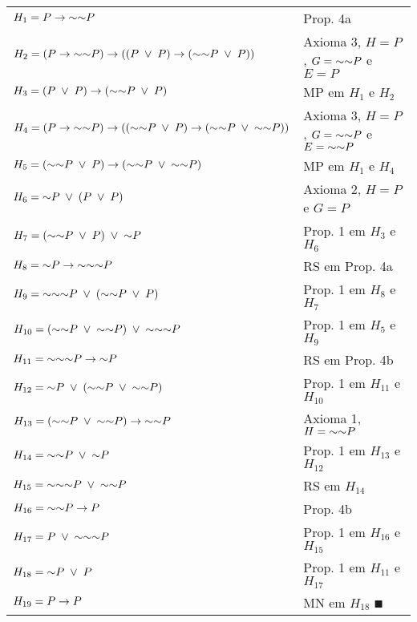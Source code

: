 \begin{tabular}{p{}p{}}
  \hline
    $H_1 = P \IMP \NOT\NOT P$                                  & Prop. 4a \\
    $H_2 = (P \IMP \NOT\NOT P) \IMP ( (P \OR P) \IMP (\NOT\NOT P \OR P) )$       & Axioma 3, $H = P$, $G = \NOT\NOT P$ e $E = P$ \\
    $H_3 = (P \OR P) \IMP (\NOT\NOT P \OR P)$                  & MP em $H_1$ e $H_2$ \\
    $H_4 = (P \IMP \NOT\NOT P) \IMP ( (\NOT\NOT P \OR P) \IMP (\NOT\NOT P \OR \NOT\NOT P) )$       & Axioma 3, $H = P$, $G = \NOT\NOT P$ e $E = \NOT\NOT P$ \\
    $H_5 = (\NOT\NOT P \OR P) \IMP (\NOT\NOT P \OR \NOT\NOT P)$       & MP em $H_1$ e $H_4$ \\
    $H_6 = \NOT P \OR (P \OR P)$                               & Axioma 2, $H = P$ e $G = P$ \\
    $H_7 = (\NOT\NOT P \OR P) \OR \NOT P$                      & Prop. 1 em $H_3$ e $H_6$\\
    $H_8 = \NOT P \IMP \NOT\NOT\NOT P$                         & RS em Prop. 4a \\
    $H_9 = \NOT\NOT\NOT P \OR (\NOT\NOT P \OR P)$              & Prop. 1 em $H_8$ e $H_7$ \\
    $H_{10} = (\NOT\NOT P \OR \NOT\NOT P) \OR  \NOT\NOT\NOT P$  & Prop. 1 em $H_5$ e $H_9$ \\
    $H_{11} = \NOT\NOT\NOT P \IMP \NOT P$                       & RS em Prop. 4b \\
    $H_{12} = \NOT P \OR (\NOT\NOT P \OR \NOT\NOT P)$           & Prop. 1 em $H_{11}$ e $H_{10}$ \\
    $H_{13} = (\NOT\NOT P \OR \NOT\NOT P) \IMP \NOT\NOT P$      & Axioma 1, $H = \NOT\NOT P$ \\
    $H_{14} = \NOT\NOT P \OR \NOT P$                            & Prop. 1 em $H_{13}$ e $H_{12}$ \\
    $H_{15} = \NOT\NOT\NOT P \OR \NOT\NOT P$                    & RS em $H_{14}$ \\
    $H_{16} = \NOT\NOT P \IMP P$                                & Prop. 4b \\
    $H_{17} = P \OR \NOT\NOT\NOT P$                             & Prop. 1 em $H_{16}$ e $H_{15}$ \\
    $H_{18} = \NOT P \OR P$                                     & Prop. 1 em $H_{11}$ e $H_{17}$ \\
    $H_{19} = P \IMP P$                                         & MN em $H_{18}$ $\QED$ \\
  \hline
\end{tabular}


